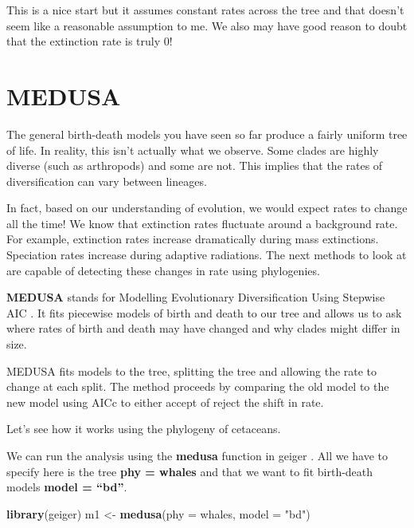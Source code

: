\documentclass[
]{book}
\newenvironment{Shaded}{\begin{snugshade}}{\end{snugshade}}
\newcommand{\DataTypeTok}[1]{\textcolor[rgb]{0.13,0.29,0.53}{#1}}
\newcommand{\KeywordTok}[1]{\textcolor[rgb]{0.13,0.29,0.53}{\textbf{#1}}}
\newcommand{\NormalTok}[1]{#1}
\newcommand{\StringTok}[1]{\textcolor[rgb]{0.31,0.60,0.02}{#1}}
\begin{document}
This is a nice start but it assumes constant rates across the tree and that doesn't seem like a reasonable assumption to me. We also may have good reason to doubt that the extinction rate is truly 0!

\hypertarget{medusa}{%
\section{MEDUSA}\label{medusa}}

The general birth-death models you have seen so far produce a fairly uniform tree of life. In reality, this isn't actually what we observe. Some clades are highly diverse (such as arthropods) and some are not. This implies that the rates of diversification can vary between lineages.

In fact, based on our understanding of evolution, we would expect rates to change all the time! We know that extinction rates fluctuate around a background rate. For example, extinction rates increase dramatically during mass extinctions. Speciation rates increase during adaptive radiations. The next methods to look at are capable of detecting these changes in rate using phylogenies.

\textbf{MEDUSA} stands for Modelling Evolutionary Diversification Using Stepwise AIC \citep{Alfaro09}. It fits piecewise models of birth and death to our tree and allows us to ask where rates of birth and death may have changed and why clades might differ in size.

MEDUSA fits models to the tree, splitting the tree and allowing the rate to change at each split. The method proceeds by comparing the old model to the new model using AICc to either accept of reject the shift in rate.

Let's see how it works using the phylogeny of cetaceans.

We can run the analysis using the \textbf{medusa} function in geiger \citep{geiger}. All we have to specify here is the tree \textbf{phy = whales} and that we want to fit birth-death models \textbf{model = ``bd''}.

\begin{Shaded}
\begin{Highlighting}[]
\KeywordTok{library}\NormalTok{(geiger)}
\NormalTok{m1 \textless{}{-}}\StringTok{ }\KeywordTok{medusa}\NormalTok{(}\DataTypeTok{phy =}\NormalTok{ whales, }\DataTypeTok{model =} \StringTok{"bd"}\NormalTok{)}
\end{Highlighting}
\end{Shaded}
\end{document}
